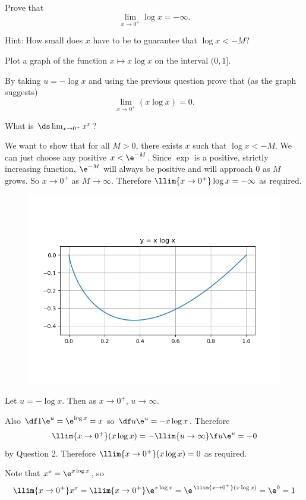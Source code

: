 \documentclass[a4paper]{article}
\begin{document}

\begin{questionbody}
Prove that \[
\lim_{x \to 0^+} \log x = -\infty.
\]

Hint: How small does $x$ have to be to guarantee that $\log x < -M$?

Plot a graph of the function $x \mapsto x \log x$ on the interval $(0, 1]$.

By taking $u = -\log x$ and using the previous question prove that (as the graph suggests) \[
\lim_{x \to 0^+} (x \log x) = 0.
\]

What is $\ds \lim_{x \to 0^+} x^x$?
\end{questionbody}

We want to show that for all $M > 0$, there exists $x$ such that $\log x < -M$. We can just choose any positive $x < \e^{-M}$. Since $\exp$ is a positive, strictly increasing function, $\e^{-M}$ will always be positive and will approach 0 as $M$ grows. So $x \to 0^+$ as $M \to \infty$. Therefore $\llim{x \to 0^+} \log x = -\infty$ as required.

\begin{figure}[h]
	\centering
	\includegraphics[scale=0.85]{xlogx}
\end{figure}

\newpage
Let $u = -\log x$. Then as $x \to 0^+$, $u \to \infty$.

Also $\df1{\e^u} = \e^{\log x} = x$ so $\df u{\e^u} = -x \log x$. Therefore $$\llim{x \to 0^+} (x \log x) = -\llim{u \to \infty} \f u{\e^u} = -0$$ by Question 2. Therefore $\llim{x \to 0^+} (x \log x) = 0$ as required.

Note that $x^x = \e^{x \log x}$, so $$\llim{x \to 0^+} x^x = \llim{x \to 0^+} \e^{x \log x} = \e^{\,\llim{x \to 0^+} (x \log x)} = \e^0 = 1$$
\end{document}
